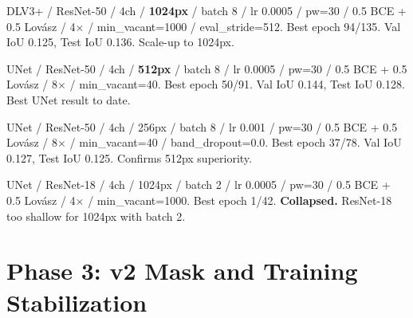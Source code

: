 \begin{description}[style=unboxed,leftmargin=0cm]
  \item[Run d\_015] DLV3+ / ResNet-50 / 4ch / \textbf{1024px} / batch 8 / lr 0.0005 / pw=30 / 0.5 BCE + 0.5 Lov\'{a}sz / 4$\times$ / min\_vacant=1000 / eval\_stride=512.
    Best epoch 94/135. Val IoU 0.125, Test IoU 0.136. Scale-up to 1024px.

  \item[Run u\_015] UNet / ResNet-50 / 4ch / \textbf{512px} / batch 8 / lr 0.0005 / pw=30 / 0.5 BCE + 0.5 Lov\'{a}sz / 8$\times$ / min\_vacant=40.
    Best epoch 50/91. Val IoU 0.144, Test IoU 0.128. Best UNet result to date.

  \item[Run u\_017] UNet / ResNet-50 / 4ch / 256px / batch 8 / lr 0.001 / pw=30 / 0.5 BCE + 0.5 Lov\'{a}sz / 8$\times$ / min\_vacant=40 / band\_dropout=0.0.
    Best epoch 37/78. Val IoU 0.127, Test IoU 0.125. Confirms 512px superiority.

  \item[Run u\_027] UNet / ResNet-18 / 4ch / 1024px / batch 2 / lr 0.0005 / pw=30 / 0.5 BCE + 0.5 Lov\'{a}sz / 4$\times$ / min\_vacant=1000.
    Best epoch 1/42. \textbf{Collapsed.} ResNet-18 too shallow for 1024px with batch 2.
\end{description}

\section{Phase 3: v2 Mask and Training Stabilization}

